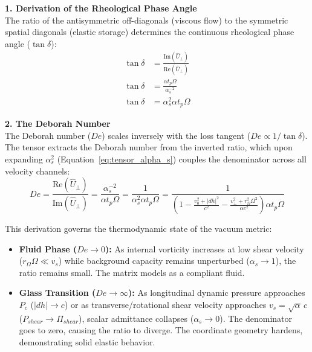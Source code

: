 \textbf{1. Derivation of the Rheological Phase Angle} \\
The ratio of the antisymmetric off-diagonals (viscous flow) to the symmetric spatial diagonals (elastic storage) determines the continuous rheological phase angle ($\tan \delta$): 
\begin{align}
    \tan \delta &= \frac{\text{Im}(\hat{U}_{\perp})}{\text{Re}(\hat{U}_{\perp})} \nonumber \\
    \tan \delta &= \frac{\alpha t_p \Omega}{\alpha_s^{-2}} \nonumber \\
    \tan \delta &= \alpha_s^2 \alpha t_p \Omega
\end{align}

\textbf{2. The Deborah Number} \\
The Deborah number ($De$) scales inversely with the loss tangent ($De \propto 1/\tan \delta$). The tensor extracts the Deborah number from the inverted ratio, which upon expanding $\alpha_s^2$ (Equation~\ref{eq:tensor_alpha_s}) couples the denominator across all velocity channels: %
\begin{equation}
    De = \frac{\text{Re}(\hat{U}_{\perp})}{\text{Im}(\hat{U}_{\perp})} = \frac{\alpha_s^{-2}}{\alpha t_p \Omega} = \frac{1}{\alpha_s^2 \alpha t_p \Omega} = \frac{1}{\left(1 - \frac{v_0^2 + |dh|^2}{c^2} - \frac{v_\perp^2 + r_\Omega^2\Omega^2}{\alpha c^2}\right)\alpha t_p \Omega} \label{eq:geometric_deborah} %
\end{equation}

This derivation governs the thermodynamic state of the vacuum metric:
\begin{itemize}
    \item \textbf{Fluid Phase ($De \to 0$):} As internal vorticity increases at low shear velocity ($r_\Omega\Omega \ll v_s$) while background capacity remains unperturbed ($\alpha_s \to 1$), the ratio remains small. The matrix models as a compliant fluid. %
    \item \textbf{Glass Transition ($De \to \infty$):} As longitudinal dynamic pressure approaches $P_c$ ($|dh| \to c$) or as transverse/rotational shear velocity approaches $v_s = \sqrt{\alpha}\,c$ ($P_{shear} \to \Pi_{shear}$), scalar admittance collapses ($\alpha_s \to 0$). The denominator goes to zero, causing the ratio to diverge. The coordinate geometry hardens, demonstrating solid elastic behavior. %
\end{itemize}

